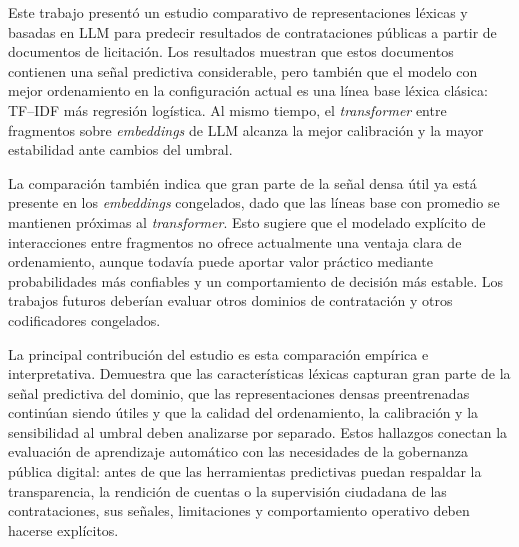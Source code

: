 Este trabajo presentó un estudio comparativo de representaciones léxicas y basadas en LLM para predecir resultados de contrataciones públicas a partir de documentos de licitación. Los resultados muestran que estos documentos contienen una señal predictiva considerable, pero también que el modelo con mejor ordenamiento en la configuración actual es una línea base léxica clásica: TF--IDF más regresión logística. Al mismo tiempo, el \textit{transformer} entre fragmentos sobre \textit{embeddings} de LLM alcanza la mejor calibración y la mayor estabilidad ante cambios del umbral.

La comparación también indica que gran parte de la señal densa útil ya está presente en los \textit{embeddings} congelados, dado que las líneas base con promedio se mantienen próximas al \textit{transformer}. Esto sugiere que el modelado explícito de interacciones entre fragmentos no ofrece actualmente una ventaja clara de ordenamiento, aunque todavía puede aportar valor práctico mediante probabilidades más confiables y un comportamiento de decisión más estable. Los trabajos futuros deberían evaluar otros dominios de contratación y otros codificadores congelados.

La principal contribución del estudio es esta comparación empírica e interpretativa. Demuestra que las características léxicas capturan gran parte de la señal predictiva del dominio, que las representaciones densas preentrenadas continúan siendo útiles y que la calidad del ordenamiento, la calibración y la sensibilidad al umbral deben analizarse por separado. Estos hallazgos conectan la evaluación de aprendizaje automático con las necesidades de la gobernanza pública digital: antes de que las herramientas predictivas puedan respaldar la transparencia, la rendición de cuentas o la supervisión ciudadana de las contrataciones, sus señales, limitaciones y comportamiento operativo deben hacerse explícitos.
